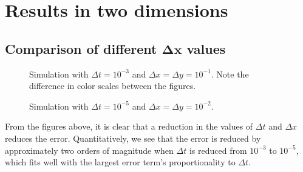 \section{Results in two dimensions}

\subsection{Comparison of different \(\boldsymbol{\Delta x}\) values}

\begin{figure}[H]

\caption{Simulation with \(\Delta t = 10^{-3}\) and \(\Delta x = \Delta y = 10^{-1}\). Note the difference in color scales between the figures.}
\end{figure}

\begin{figure}[H]

\caption{Simulation with \(\Delta t = 10^{-5}\) and \(\Delta x = \Delta y = 10^{-2}\).}
\end{figure}

From the figures above, it is clear that a reduction in the values of \(\Delta t\) and \(\Delta x\) reduces the error. Quantitatively, we see that the error is reduced by approximately two orders of magnitude when \(\Delta t\) is reduced from \(10^{-3}\) to \(10^{-5}\), which fits well with the largest error term's proportionality to \(\Delta t\).

